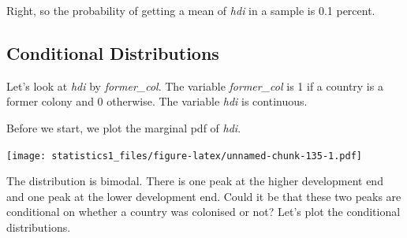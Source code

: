\documentclass[]{book}
\newenvironment{Shaded}{\begin{snugshade}}{\end{snugshade}}
\newcommand{\KeywordTok}[1]{\textcolor[rgb]{0.13,0.29,0.53}{\textbf{#1}}}
\newcommand{\DataTypeTok}[1]{\textcolor[rgb]{0.13,0.29,0.53}{#1}}
\newcommand{\DecValTok}[1]{\textcolor[rgb]{0.00,0.00,0.81}{#1}}
\newcommand{\StringTok}[1]{\textcolor[rgb]{0.31,0.60,0.02}{#1}}
\newcommand{\OperatorTok}[1]{\textcolor[rgb]{0.81,0.36,0.00}{\textbf{#1}}}
\newcommand{\NormalTok}[1]{#1}
\theoremstyle{definition}
\theoremstyle{definition}
\theoremstyle{definition}
\theoremstyle{remark}
\begin{document}
Right, so the probability of getting a mean of \emph{hdi} in a sample is
0.1 percent.

\subsection{Conditional Distributions}\label{conditional-distributions}

Let's look at \emph{hdi} by \emph{former\_col}. The variable
\emph{former\_col} is 1 if a country is a former colony and 0 otherwise.
The variable \emph{hdi} is continuous.

Before we start, we plot the marginal pdf of \emph{hdi}.

\begin{Shaded}
\end{Shaded}

\texttt{[image: statistics1\_files/figure-latex/unnamed-chunk-135-1.pdf]}

The distribution is bimodal. There is one peak at the higher development
end and one peak at the lower development end. Could it be that these
two peaks are conditional on whether a country was colonised or not?
Let's plot the conditional distributions.

\begin{Shaded}
\end{Shaded}
\end{document}
